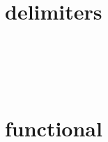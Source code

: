 \section{delimiters}








\begin{lstlisting}[language=JavaScript]

\end{lstlisting}




\begin{lstlisting}[language=JavaScript]

\end{lstlisting}




\begin{lstlisting}[language=JavaScript]

\end{lstlisting}




\begin{lstlisting}[language=JavaScript]

\end{lstlisting}




\begin{lstlisting}[language=JavaScript]

\end{lstlisting}




\begin{lstlisting}[language=JavaScript]

\end{lstlisting}






\section{functional}








\begin{lstlisting}[language=JavaScript]

\end{lstlisting}




\begin{lstlisting}[language=JavaScript]

\end{lstlisting}




